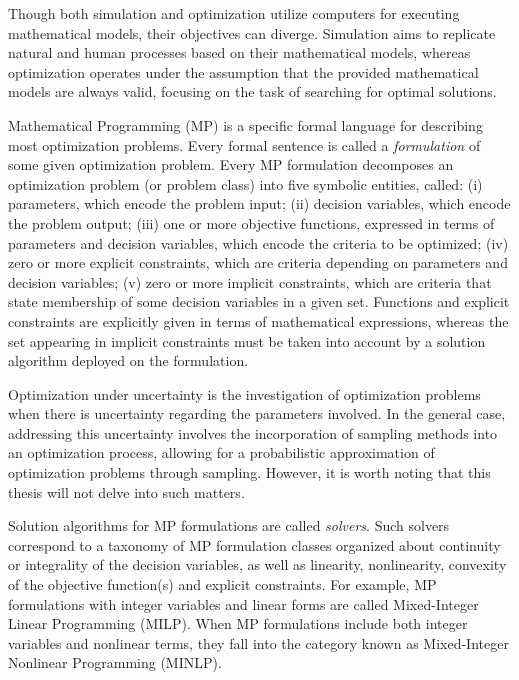 Though both simulation and optimization utilize computers for executing mathematical models, their objectives can diverge. Simulation aims to replicate natural and human processes based on their mathematical models, whereas optimization operates under the assumption that the provided mathematical models are always valid, focusing on the task of searching for optimal solutions. 

Mathematical Programming (MP) is a specific formal language for describing most optimization problems. Every formal sentence is called a \emph{formulation} of some given optimization problem. Every MP formulation decomposes an optimization problem (or problem class) into five symbolic entities, called: (i) parameters, which encode the problem input; (ii) decision variables, which encode the problem output; (iii) one or more objective functions, expressed in terms of parameters and decision variables, which encode the criteria to be optimized; (iv) zero or more explicit constraints, which are criteria depending on parameters and decision variables; (v) zero or more implicit constraints, which are criteria that state membership of some decision variables in a given set. Functions and explicit constraints are explicitly given in terms of mathematical expressions, whereas the set appearing in implicit constraints must be taken into account by a solution algorithm deployed on the formulation.




 Optimization under uncertainty is the investigation of optimization problems when there is uncertainty regarding the parameters involved. In the general case, addressing this uncertainty involves the incorporation of sampling methods into an optimization process, allowing for a probabilistic approximation of optimization problems through sampling. However, it is worth noting that this thesis will not delve into such matters.


Solution algorithms for MP formulations are called \emph{solvers}. Such solvers correspond to a taxonomy of MP formulation classes organized about continuity or integrality of the decision variables, as well as linearity, nonlinearity, convexity of the objective function(s) and explicit constraints. For example, MP formulations with integer variables and linear forms are called Mixed-Integer Linear Programming (MILP). 
When MP formulations include both integer variables and nonlinear terms, they fall into the category known as Mixed-Integer Nonlinear Programming (MINLP).

